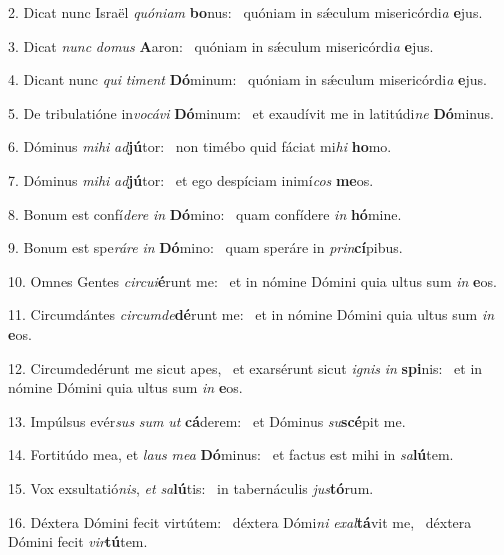 2. Dicat nunc Israël \textit{quón}\textit{i}\textit{am} \textbf{bo}nus: \ast\  quóniam in sǽculum misericórdi\textit{a} \textbf{e}jus.\

3. Dicat \textit{nunc} \textit{do}\textit{mus} \textbf{A}aron: \ast\  quóniam in sǽculum misericórdi\textit{a} \textbf{e}jus.\

4. Dicant nunc \textit{qui} \textit{ti}\textit{ment} \textbf{Dó}minum: \ast\  quóniam in sǽculum misericórdi\textit{a} \textbf{e}jus.\

5. De tribulatióne in\textit{vo}\textit{cá}\textit{vi} \textbf{Dó}minum: \ast\  et exaudívit me in latitúdi\textit{ne} \textbf{Dó}minus.\

6. Dóminus \textit{mi}\textit{hi} \textit{ad}\textbf{jú}tor: \ast\  non timébo quid fáciat mi\textit{hi} \textbf{ho}mo.\

7. Dóminus \textit{mi}\textit{hi} \textit{ad}\textbf{jú}tor: \ast\  et ego despíciam inimí\textit{cos} \textbf{me}os.\

8. Bonum est confí\textit{de}\textit{re} \textit{in} \textbf{Dó}mino: \ast\  quam confídere \textit{in} \textbf{hó}mine.\

9. Bonum est spe\textit{rá}\textit{re} \textit{in} \textbf{Dó}mino: \ast\  quam speráre in \textit{prin}\textbf{cí}pibus.\

10. Omnes Gentes \textit{cir}\textit{cu}\textit{i}\textbf{é}runt me: \ast\  et in nómine Dómini quia ultus sum \textit{in} \textbf{e}os.\

11. Circumdántes \textit{cir}\textit{cum}\textit{de}\textbf{dé}runt me: \ast\  et in nómine Dómini quia ultus sum \textit{in} \textbf{e}os.\

12. Circumdedérunt me sicut apes, \dag\  et exarsérunt sicut \textit{i}\textit{gnis} \textit{in} \textbf{spi}nis: \ast\  et in nómine Dómini quia ultus sum \textit{in} \textbf{e}os.\

13. Impúlsus evér\textit{sus} \textit{sum} \textit{ut} \textbf{cá}derem: \ast\  et Dóminus \textit{su}\textbf{scé}pit me.\

14. Fortitúdo mea, et \textit{laus} \textit{me}\textit{a} \textbf{Dó}minus: \ast\  et factus est mihi in \textit{sa}\textbf{lú}tem.\

15. Vox exsultatió\textit{nis}, \textit{et} \textit{sa}\textbf{lú}tis: \ast\  in tabernáculis \textit{jus}\textbf{tó}rum.\

16. Déxtera Dómini fecit virtútem: \dag\  déxtera Dómi\textit{ni} \textit{ex}\textit{al}\textbf{tá}vit me, \ast\  déxtera Dómini fecit \textit{vir}\textbf{tú}tem.\

